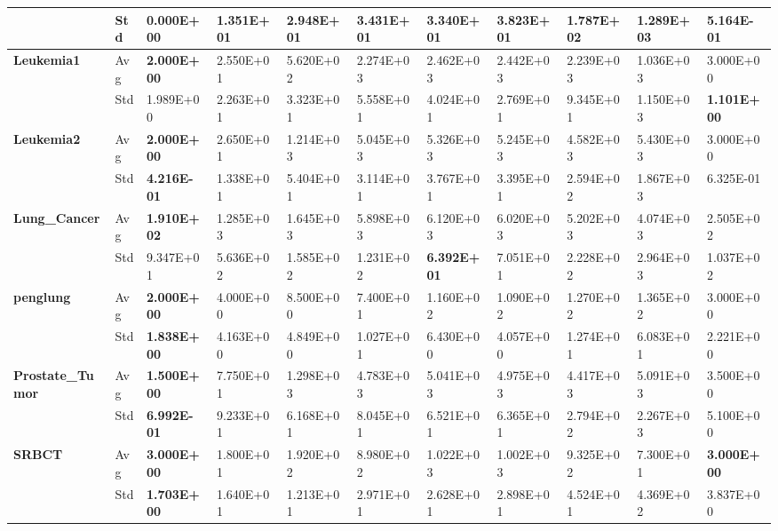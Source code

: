 \documentclass{article} %
\begin{document}
\begin{tabular}{|p{0.6in}|p{0.3in}|p{0.4in}|p{0.4in}|p{0.4in}|p{0.4in}|p{0.4in}|p{0.4in}|p{0.4in}|p{0.4in}|p{0.4in}|}
\textbf{} & Std & \textbf{0.000E+00} & 1.351E+01 & 2.948E+01 & 3.431E+01 & 3.340E+01 & 3.823E+01 & 1.787E+02 & 1.289E+03 & 5.164E-01 \\ \hline 
\textbf{Leukemia1} & Avg & \textbf{2.000E+00} & 2.550E+01 & 5.620E+02 & 2.274E+03 & 2.462E+03 & 2.442E+03 & 2.239E+03 & 1.036E+03 & 3.000E+00 \\ \hline 
\textbf{} & Std & 1.989E+00\textbf{} & 2.263E+01 & 3.323E+01 & 5.558E+01 & 4.024E+01 & 2.769E+01 & 9.345E+01 & 1.150E+03 & \textbf{1.101E+00} \\ \hline 
\textbf{Leukemia2} & Avg & \textbf{2.000E+00} & 2.650E+01\textbf{} & 1.214E+03 & 5.045E+03 & 5.326E+03\textbf{} & 5.245E+03 & 4.582E+03 & 5.430E+03 & 3.000E+00 \\ \hline 
\textbf{} & Std & \textbf{4.216E-01} & 1.338E+01\textbf{} & 5.404E+01 & 3.114E+01 & 3.767E+01\textbf{} & 3.395E+01 & 2.594E+02 & 1.867E+03 & 6.325E-01 \\ \hline 
\textbf{Lung\_Cancer} & Avg & \textbf{1.910E+02} & 1.285E+03 & 1.645E+03 & 5.898E+03 & 6.120E+03\textbf{} & 6.020E+03 & 5.202E+03 & 4.074E+03 & 2.505E+02 \\ \hline 
\textbf{} & Std & 9.347E+01\textbf{} & 5.636E+02 & 1.585E+02 & 1.231E+02 & \textbf{6.392E+01} & 7.051E+01 & 2.228E+02 & 2.964E+03 & 1.037E+02 \\ \hline 
\textbf{penglung} & Avg & \textbf{2.000E+00} & 4.000E+00\textbf{} & 8.500E+00\textbf{} & 7.400E+01 & 1.160E+02 & 1.090E+02 & 1.270E+02\textbf{} & 1.365E+02 & 3.000E+00 \\ \hline 
\textbf{} & Std & \textbf{1.838E+00} & 4.163E+00\textbf{} & 4.849E+00\textbf{} & 1.027E+01 & 6.430E+00 & 4.057E+00 & 1.274E+01\textbf{} & 6.083E+01 & 2.221E+00 \\ \hline 
\textbf{Prostate\_Tumor} & Avg & \textbf{1.500E+00} & 7.750E+01 & 1.298E+03 & 4.783E+03 & 5.041E+03\textbf{} & 4.975E+03 & 4.417E+03\textbf{} & 5.091E+03 & 3.500E+00 \\ \hline 
\textbf{} & Std & \textbf{6.992E-01} & 9.233E+01 & 6.168E+01 & 8.045E+01 & 6.521E+01\textbf{} & 6.365E+01 & 2.794E+02\textbf{} & 2.267E+03 & 5.100E+00 \\ \hline 
\textbf{SRBCT} & Avg & \textbf{3.000E+00} & 1.800E+01 & 1.920E+02 & 8.980E+02 & 1.022E+03\textbf{} & 1.002E+03 & 9.325E+02\textbf{} & 7.300E+01 & \textbf{3.000E+00} \\ \hline 
\textbf{} & Std & \textbf{1.703E+00} & 1.640E+01 & 1.213E+01 & 2.971E+01 & 2.628E+01\textbf{} & 2.898E+01 & 4.524E+01\textbf{} & 4.369E+02 & 3.837E+00 \\ \hline 
\end{tabular}
\end{document}
